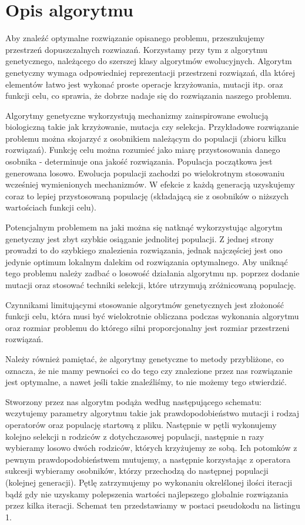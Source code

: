 \documentclass[12pt]{article}
\begin{document}
\section{Opis algorytmu}
Aby znaleźć optymalne rozwiązanie opisanego problemu, przeszukujemy przestrzeń dopuszczalnych rozwiazań. Korzystamy przy tym z algorytmu genetycznego, należącego do szerszej klasy algorytmów ewolucyjnych. Algorytm genetyczny wymaga odpowiedniej reprezentacji przestrzeni rozwiązań, dla której elementów łatwo jest wykonać proste operacje krzyżowania, mutacji itp. oraz funkcji celu, co sprawia, że dobrze nadaje się do rozwiązania naszego problemu. \par
Algorytmy genetyczne wykorzystują mechanizmy zainspirowane ewolucją biologiczną takie jak krzyżowanie, mutacja czy selekcja. Przykładowe rozwiązanie problemu można skojarzyć z osobnikiem należącym do populacji (zbioru kilku rozwiązań). Funkcję celu można rozumieć jako miarę przystosowania danego osobnika - determinuje ona jakość rozwiązania. Populacja początkowa jest generowana losowo. Ewolucja populacji zachodzi po wielokrotnym stosowaniu wcześniej wymienionych mechanizmów. W efekcie z każdą generacją uzyskujemy coraz to lepiej przystosowaną populację (składającą sie z osobników o niższych wartościach funkcji celu). \par
Potencjalnym problemem na jaki można się natknąć wykorzystując algorytm genetyczny jest zbyt szybkie osiąganie jednolitej populacji. Z jednej strony prowadzi to do szybkiego znalezienia rozwiązania, jednak najczęściej jest ono jedynie optimum lokalnym dalekim od rozwiązania optymalnego. Aby uniknąć tego problemu należy zadbać o losowość działania algorytmu np. poprzez dodanie mutacji oraz stosować techniki selekcji, które utrzymują zróżnicowaną populację. \par
Czynnikami limitującymi stosowanie algorytmów genetycznych jest złożoność funkcji celu, która musi być wielokrotnie obliczana podczas wykonania algorytmu oraz rozmiar problemu do którego silni proporcjonalny jest rozmiar przestrzeni rozwiązań. \par
Należy również pamiętać, że algorytmy genetyczne to metody przybliżone, co oznacza, że nie mamy pewności co do tego czy znalezione przez nas rozwiązanie jest optymalne, a nawet jeśli takie znaleźliśmy, to nie możemy tego stwierdzić. \par
Stworzony przez nas algorytm podąża według następującego schematu: wczytujemy parametry algorytmu takie jak prawdopodobieństwo mutacji i rodzaj operatorów oraz populację startową z pliku. Następnie w pętli wykonujemy kolejno selekcji n rodziców z dotychczasowej populacji, następnie n razy wybieramy losowo dwóch rodziców, których krzyżujemy ze sobą. Ich potomków z pewnym prawdopodobieństwem mutujemy, a następnie korzystając z operatora sukcesji wybieramy osobników, którzy przechodzą do następnej populacji (kolejnej generacji). Pętlę zatrzymujemy po wykonaniu okrelślonej ilości iteracji bądź gdy nie uzyskamy polepszenia wartości najlepszego globalnie rozwiązania przez kilka iteracji. Schemat ten przedstawiamy w postaci pseudokodu na listingu 1.
\end{document}
